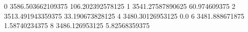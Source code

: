 0 3586.503662109375 106.202392578125
1 3541.27587890625 60.974609375
2 3513.491943359375 33.190673828125
4 3480.30126953125 0.0
6 3481.888671875 1.58740234375
8 3486.126953125 5.82568359375
